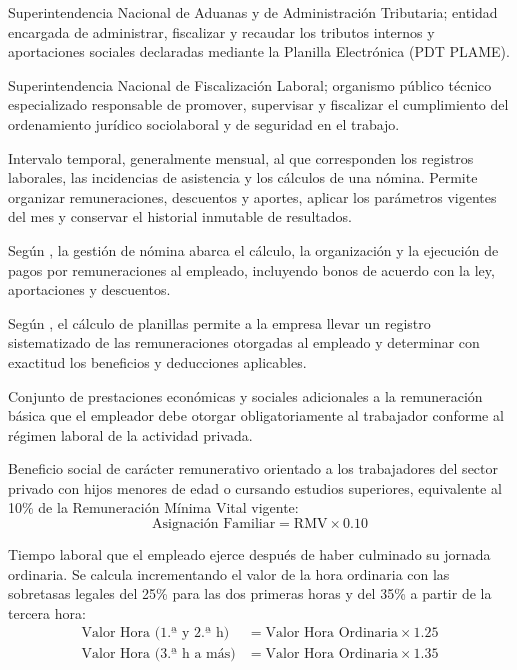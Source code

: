 Superintendencia Nacional de Aduanas y de Administración Tributaria; entidad encargada de administrar, 
fiscalizar y recaudar los tributos internos y aportaciones sociales declaradas mediante la Planilla Electrónica (PDT PLAME).

Superintendencia Nacional de Fiscalización Laboral; organismo público técnico especializado responsable de promover, 
supervisar y fiscalizar el cumplimiento del ordenamiento jurídico sociolaboral y de seguridad en el trabajo.

Intervalo temporal, generalmente mensual, al que corresponden los registros laborales, las incidencias de asistencia y 
los cálculos de una nómina. Permite organizar remuneraciones, descuentos y aportes, aplicar los parámetros vigentes del mes 
y conservar el historial inmutable de resultados.

Según \textcite{quispe2025implementacion}, la gestión de nómina abarca el cálculo, la organización y la ejecución de pagos 
por remuneraciones al empleado, incluyendo bonos de acuerdo con la ley, aportaciones y descuentos.

Según \textcite{lima2022implementacion}, el cálculo de planillas permite a la empresa llevar un registro sistematizado 
de las remuneraciones otorgadas al empleado y determinar con exactitud los beneficios y deducciones aplicables.

Conjunto de prestaciones económicas y sociales adicionales a la remuneración básica que el empleador 
debe otorgar obligatoriamente al trabajador conforme al régimen laboral de la actividad privada.

Beneficio social de carácter remunerativo orientado a los trabajadores del sector privado con hijos menores de edad o 
cursando estudios superiores, equivalente al 10\% de la Remuneración Mínima Vital vigente:
\[
\text{Asignación Familiar} = \text{RMV} \times 0.10
\]

Tiempo laboral que el empleado ejerce después de haber culminado su jornada ordinaria. Se calcula incrementando el valor 
de la hora ordinaria con las sobretasas legales del 25\% para las dos primeras horas y del 35\% a partir de la tercera hora:
\begin{align*}
    \text{Valor Hora (1.ª y 2.ª h)} &= \text{Valor Hora Ordinaria} \times 1.25 \\
    \text{Valor Hora (3.ª h a más)} &= \text{Valor Hora Ordinaria} \times 1.35
\end{align*}

